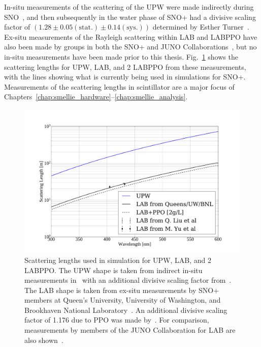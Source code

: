 In-situ measurements of the scattering of the UPW were made indirectly during SNO~\cite{moffatOpticalCalibrationSudbury2001}, and then subsequently in the water phase of SNO+ had a divisive scaling factor of $(1.28\pm0.05(\mathrm{stat.})\pm0.14(\mathrm{sys.}))$ determined by Esther Turner~\cite{turnerMeasurementScatteringCharacteristics2022}. Ex-situ measurements of the Rayleigh scattering within LAB and LABPPO have also been made by groups in both the SNO+ and JUNO Collaborations~\cite{chenOpticalPropertiesRAT2012,seguiScintillatorModelComparison2015,liuAttenuationScatteringTeBD2016,liuRayleighScatteringDepolarization2015,yuMeasurementsRayleighRatios2022}, %
but no in-situ measurements have been made prior to this thesis. Fig.~\ref{fig:scattering_lengths_upw_labppo_current} shows the scattering lengths for UPW, LAB, and \SI{2}{\gpl} LABPPO from these measurements, with the lines showing what is currently being used in simulations for SNO+. Measurements of the scattering lengths in scintillator are a major focus of Chapters~\ref{chap:smellie_hardware}--\ref{chap:smellie_analysis}.

\begin{figure}[!ht]
    \centering
    \includegraphics[width=0.8\linewidth]{2_Detector/Figs/scattering_lengths_plot.pdf}
    \caption[Scattering lengths in simulation for UPW, LAB, and \SI{2.2}{\gpl} LABPPO]
    {Scattering lengths used in simulation for UPW, LAB, and \SI{2}{\gpl} LABPPO. The UPW shape is taken from indirect in-situ measurements in~\cite{moffatOpticalCalibrationSudbury2001} with an additional divisive scaling factor from~\cite{turnerMeasurementScatteringCharacteristics2022}. The LAB shape is taken from ex-situ measurements by SNO+ members at Queen's University, University of Washington, and Brookhaven National Laboratory~\cite{chenOpticalPropertiesRAT2012,seguiScintillatorModelComparison2015}. An additional divisive scaling factor of 1.176 due to PPO was made by~\cite{liuAttenuationScatteringTeBD2016}. For comparison, measurements by members of the JUNO Collaboration for LAB are also shown~\cite{liuRayleighScatteringDepolarization2015,yuMeasurementsRayleighRatios2022}.}
    \label{fig:scattering_lengths_upw_labppo_current}
\end{figure}

